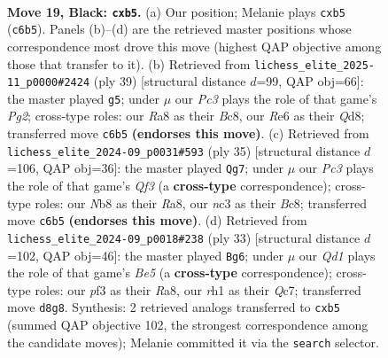 \documentclass[11pt]{article}
\begin{document}
\clearpage

\begin{figure}[p]\centering
\begin{subfigure}{0.46\textwidth}\centering
\resizebox{\linewidth}{!}{%
\newchessgame
\chessboard[
  setfen={rnbq4/pp4kp/2p1r2p/1P1p4/P2P2Pb/2N1PP2/2QKN3/R4B1R b - - 0 19},
  showmover=false,
  pgfstyle=straightmove, color=movearrow, markmove={c6-b5}
]}
\caption{}
\end{subfigure}\hfill
\begin{subfigure}{0.46\textwidth}\centering
\resizebox{\linewidth}{!}{%
\newchessgame
\chessboard[
  setfen={2bq1bk1/5rpp/2n2p1P/1pp1p3/4P3/3PNN2/2PBQPP1/R5K1 b - - 0 20},
  showmover=false,
  pgfstyle=straightmove, color=movearrow, markmove={g7-g5}
]}
\caption{}
\end{subfigure}
\\[4pt]
\begin{subfigure}{0.46\textwidth}\centering
\resizebox{\linewidth}{!}{%
\newchessgame
\chessboard[
  setfen={r1b1k2r/ppp2p2/3ppq1b/4n1pP/2P1P3/1PN1B3/PK1QN1P1/5R1R b kq - 3 18},
  showmover=false,
  pgfstyle=straightmove, color=movearrow, markmove={f6-g7}
]}
\caption{}
\end{subfigure}\hfill
\begin{subfigure}{0.46\textwidth}\centering
\resizebox{\linewidth}{!}{%
\newchessgame
\chessboard[
  setfen={r6r/p1q1nkpp/3b1p2/2Npp3/Q2Pb3/1NP3P1/PP3P1P/R3KBR1 b Q - 1 17},
  showmover=false,
  pgfstyle=straightmove, color=movearrow, markmove={e4-g6}
]}
\caption{}
\end{subfigure}
\caption{\textbf{Move 19, Black: \texttt{cxb5}.} (a) Our position; Melanie plays \texttt{cxb5} (\texttt{c6b5}). Panels (b)--(d) are the retrieved master positions whose correspondence most drove this move (highest QAP objective among those that transfer to it). (b) Retrieved from \texttt{lichess\_elite\_2025-11\_p0000\#2424} (ply 39) [structural distance $d$=99, QAP obj=66]: the master played \texttt{g5}; under $\mu$ our \emph{Pc3} plays the role of that game's \emph{Pg2}; cross-type roles: our \emph{R}a8 as their \emph{B}c8, our \emph{R}e6 as their \emph{Q}d8; transferred move \texttt{c6b5} \textbf{(endorses this move)}. (c) Retrieved from \texttt{lichess\_elite\_2024-09\_p0031\#593} (ply 35) [structural distance $d$=106, QAP obj=36]: the master played \texttt{Qg7}; under $\mu$ our \emph{Pc3} plays the role of that game's \emph{Qf3} (a \textbf{cross-type} correspondence); cross-type roles: our \emph{N}b8 as their \emph{R}a8, our \emph{n}c3 as their \emph{B}c8; transferred move \texttt{c6b5} \textbf{(endorses this move)}. (d) Retrieved from \texttt{lichess\_elite\_2024-09\_p0018\#238} (ply 33) [structural distance $d$=102, QAP obj=46]: the master played \texttt{Bg6}; under $\mu$ our \emph{Qd1} plays the role of that game's \emph{Be5} (a \textbf{cross-type} correspondence); cross-type roles: our \emph{p}f3 as their \emph{R}a8, our \emph{r}h1 as their \emph{Q}c7; transferred move \texttt{d8g8}. Synthesis: 2 retrieved analogs transferred to \texttt{cxb5} (summed QAP objective 102, the strongest correspondence among the candidate moves); Melanie committed it via the \texttt{search} selector.}
\label{fig:thought-m37}
\end{figure}
\end{document}
